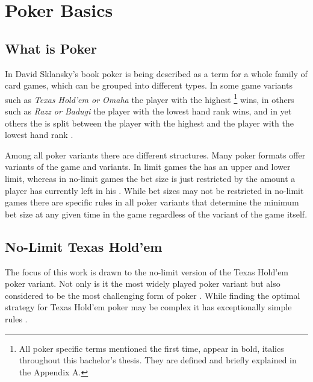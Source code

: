 
\chapter{Poker Basics}
\label{cha:pokerBasics}
\section{What is Poker}
In David Sklansky's book \cite{theory_of_poker} poker is being described as a term for a whole family of card games, which can be grouped into different types. In some game variants such as  \textit{Texas Hold'em or Omaha} the player with the highest  \footnote{All poker specific terms mentioned the first time, appear in bold, italics throughout this bachelor's thesis. They are defined and briefly explained in the Appendix A.} wins, in others such as \textit{Razz or Badugi} the player with the lowest hand rank wins, and in yet others the  is split between the player with the highest and the player with the lowest hand rank \cite{theory_of_poker}.\par
Among all poker variants there are different  structures. Many poker formats offer  variants of the game and  variants. In limit games the  has an upper and lower limit, whereas in no-limit games the bet size is just restricted by the amount a player has currently left in his  \cite{theory_of_poker}. While bet sizes may not be restricted in no-limit games there are specific rules in all poker variants that determine the minimum bet size at any given time in the game regardless of the variant of the game itself.
\section{No-Limit Texas Hold'em}
The focus of this work is drawn to the no-limit version of the Texas Hold'em poker variant. Not only is it the most widely played poker variant but also considered to be the most challenging form of poker \cite{strong_poker}. While finding the optimal strategy for Texas Hold'em poker may be complex it has exceptionally simple rules \cite{billings_phd}.
